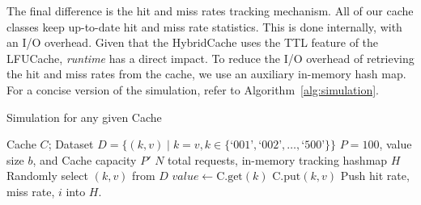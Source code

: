The final difference is the hit and miss rates tracking mechanism.
All of our cache classes keep up-to-date hit and miss
rate statistics. This is done internally, with an I/O overhead.
Given that the HybridCache uses the TTL feature
of the LFUCache, \textit{runtime} has a direct
impact. To reduce the I/O overhead
of retrieving the hit and miss rates from
the cache, we use an auxiliary in-memory hash map.
For a concise version of the simulation,
refer to Algorithm~\ref{alg:simulation}.

\begin{algorithm}
    \caption{Simulation for any given Cache}
    \label{alg:simulation}
    \begin{algorithmic}[1]
    \Require Cache $C$; Dataset $D = \{(k, v) \mid k = v, k \in \{\text{`001'}, \text{`002'}, \ldots, \text{`500'}\}\}$
    \Require $P=100$, value size $b$, and Cache capacity $P'$
    \Require $N$ total requests,
        in-memory tracking hashmap $H$
        \State Randomly select $(k, v)$ from $D$
        \State $value \gets \text{C.get}(k)$
            \State $\text{C.put}(k, v)$
        \EndIf
        \State Push hit rate, miss rate, $i$ into $H$.
    \EndFor
    \end{algorithmic}
\end{algorithm}